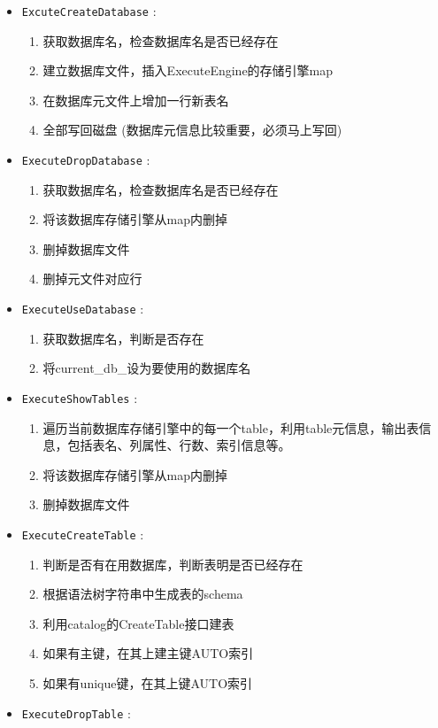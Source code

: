 \documentclass[12pt, a4paper]{article}
\def\c#1{\texttt{#1}}
\begin{document}
\begin{itemize}
  \item \c{ExcuteCreateDatabase} : \begin{enumerate}
    \item 获取数据库名，检查数据库名是否已经存在
    \item 建立数据库文件，插入ExecuteEngine的存储引擎map
    \item 在数据库元文件上增加一行新表名
    \item 全部写回磁盘 (数据库元信息比较重要，必须马上写回)
  \end{enumerate}
  \item  \c{ExecuteDropDatabase} : \begin{enumerate}
    \item 获取数据库名，检查数据库名是否已经存在
    \item 将该数据库存储引擎从map内删掉
    \item 删掉数据库文件
    \item 删掉元文件对应行
  \end{enumerate}
  \item  \c{ExecuteUseDatabase} : \begin{enumerate}
    \item 获取数据库名，判断是否存在
    \item 将current\_db\_设为要使用的数据库名
  \end{enumerate}
  \item  \c{ExecuteShowTables} : \begin{enumerate}
    \item 遍历当前数据库存储引擎中的每一个table，利用table元信息，输出表信息，包括表名、列属性、行数、索引信息等。
    \item 将该数据库存储引擎从map内删掉
    \item 删掉数据库文件
  \end{enumerate}
  \item  \c{ExecuteCreateTable} : \begin{enumerate}
    \item 判断是否有在用数据库，判断表明是否已经存在
    \item 根据语法树字符串中生成表的schema
    \item 利用catalog的CreateTable接口建表
    \item 如果有主键，在其上建主键AUTO索引
    \item 如果有unique键，在其上键AUTO索引
  \end{enumerate}
  \item  \c{ExecuteDropTable} : \begin{enumerate}

\end{enumerate}
\end{itemize}
\end{document}
